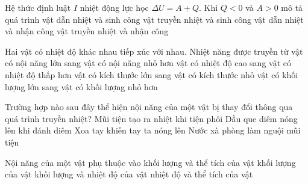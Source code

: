 \begin{ex}
Hệ thức định luật $I$ nhiệt động lực học $\Delta U=A+Q$. Khi $Q<0$ và $A>0$ mô tả quá trình
\choice
{vật dẫn nhiệt và sinh công}
{vật truyền nhiệt và sinh công}
{vật dẫn nhiệt và nhận công}
{\True vật truyền nhiệt và nhận công}
\end{ex}

\begin{ex}
Hai vật có nhiệt độ khác nhau tiếp xúc với nhau. Nhiệt năng được truyền từ
\choice
{vật có nội năng lớn sang vật có nội năng nhỏ hơn}
{\True vật có nhiệt độ cao sang vật có nhiệt độ thấp hơn}
{vật có kích thước lớn sang vật có kích thước nhỏ}
{vật có khối lượng lớn sang vật có khối lượng nhỏ hơn}
\end{ex}

\begin{ex}
Trường hợp nào sau đây thể hiện nội năng của một vật bị thay đổi thông qua quá trình truyền nhiệt?
\choice
{Mũi tiện tạo ra nhiệt khi tiện phôi}
{Dầu que diêm nóng lên khi đánh diêm}
{Xoa tay khiến tay ta nóng lên}
{\True Nước xà phòng làm nguội mũi tiện}
\end{ex}

\begin{ex}
Nội năng của một vật phụ thuộc vào
\choice
{khối lượng và thể tích của vật}
{khối lượng của vật}
{khối lượng và nhiệt độ của vật}
{\True nhiệt độ và thể tích của vật}
\end{ex}

